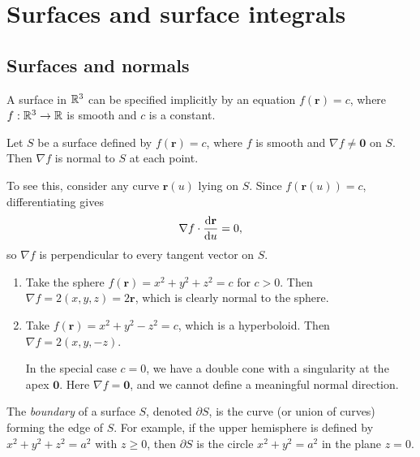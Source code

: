 \documentclass[a4paper]{article}
\begin{document}
\section{Surfaces and surface integrals}
\subsection{Surfaces and normals}
A surface in $\mathbb{R}^3$ can be specified implicitly by an equation $f(\mathbf{r}) = c$, where $f: \mathbb{R}^3 \to \mathbb{R}$ is smooth and $c$ is a constant.

\begin{prop}
  Let $S$ be a surface defined by $f(\mathbf{r}) = c$, where $f$ is smooth and $\nabla f \neq \mathbf{0}$ on $S$. Then $\nabla f$ is normal to $S$ at each point.
\end{prop}

\begin{rmk}
  To see this, consider any curve $\mathbf{r}(u)$ lying on $S$. Since $f(\mathbf{r}(u)) = c$, differentiating gives
  \[
    \nabla f \cdot \frac{\mathrm{d}\mathbf{r}}{\mathrm{d} u} = 0,
  \]
  so $\nabla f$ is perpendicular to every tangent vector on $S$.
\end{rmk}

\begin{eg}\leavevmode
  \begin{enumerate}
    \item Take the sphere $f(\mathbf{r}) = x^2 + y^2 + z^2 = c$ for $c > 0$. Then $\nabla f = 2(x, y, z) = 2\mathbf{r}$, which is clearly normal to the sphere.
    \item Take $f(\mathbf{r}) = x^2 + y^2 - z^2 = c$, which is a hyperboloid. Then $\nabla f = 2(x, y, -z)$.

      In the special case $c = 0$, we have a double cone with a singularity at the apex $\mathbf{0}$. Here $\nabla f = \mathbf{0}$, and we cannot define a meaningful normal direction.
  \end{enumerate}
\end{eg}

\begin{defi}
  The \emph{boundary} of a surface $S$, denoted $\partial S$, is the curve (or union of curves) forming the edge of $S$. For example, if the upper hemisphere is defined by $x^2 + y^2 + z^2 = a^2$ with $z \geq 0$, then $\partial S$ is the circle $x^2 + y^2 = a^2$ in the plane $z = 0$.
\end{defi}
\end{document}
